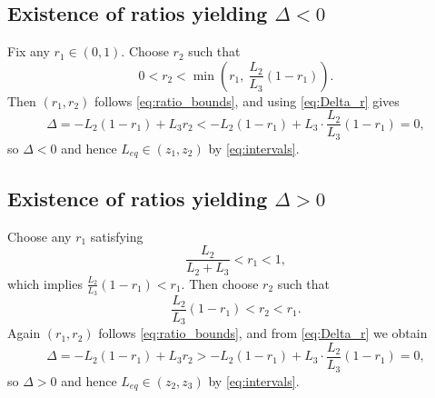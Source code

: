 \subsection*{Existence of ratios yielding $\Delta < 0$}
Fix any $r_1\in(0,1)$. Choose $r_2$ such that
\begin{equation*}
0<r_2<\min\!\left(r_1,\ \frac{L_2}{L_3}(1-r_1)\right).
\end{equation*}
Then $(r_1,r_2)$ follows \cref{eq:ratio_bounds}, and using \cref{eq:Delta_r} gives
\begin{equation*}
\Delta = -L_2(1-r_1)+L_3r_2 < -L_2(1-r_1)+L_3\cdot \frac{L_2}{L_3}(1-r_1)=0,
\end{equation*}
so $\Delta<0$ and hence $L_{eq}\in(z_1,z_2)$ by \cref{eq:intervals}.

\subsection*{Existence of ratios yielding $\Delta > 0$}
Choose any $r_1$ satisfying
\begin{equation*}
\frac{L_2}{L_2+L_3}<r_1<1,
\end{equation*}
which implies $\frac{L_2}{L_3}(1-r_1)<r_1$. Then choose $r_2$ such that
\begin{equation*}
\frac{L_2}{L_3}(1-r_1)<r_2<r_1.
\end{equation*}
Again $(r_1,r_2)$ follows \cref{eq:ratio_bounds}, and from \cref{eq:Delta_r} we obtain
\begin{equation*}
\Delta = -L_2(1-r_1)+L_3r_2 > -L_2(1-r_1)+L_3\cdot \frac{L_2}{L_3}(1-r_1)=0,
\end{equation*}
so $\Delta>0$ and hence $L_{eq}\in(z_2,z_3)$ by \cref{eq:intervals}.

\hfill \break
\hfill \break
\begin{center}
    \noindent{}
\end{center}

